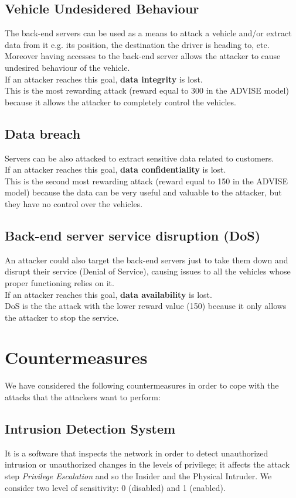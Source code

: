 \subsection*{Vehicle Undesidered Behaviour}
The back-end servers can be used as a means to attack a vehicle and/or extract data from it e.g. its position, the destination the driver is heading to, etc.\\
Moreover having accesses to the back-end server allows the attacker to cause undesired behaviour of the vehicle.\\
If an attacker reaches this goal, \textbf{data integrity} is lost.\\
This is the most rewarding attack (reward equal to 300 in the ADVISE model) because it allows the attacker to completely control the vehicles.

\subsection*{Data breach}
Servers can be also attacked to extract sensitive data related to customers.\\
If an attacker reaches this goal, \textbf{data confidentiality} is lost.\\
This is the second most rewarding attack (reward equal to 150 in the ADVISE model) because the data can be very useful and valuable to the attacker, but they have no control over the vehicles.

\subsection*{Back-end server service disruption (DoS)}
An attacker could also target the back-end servers just to take them down and disrupt their service (Denial of Service), causing issues to all the vehicles whose proper functioning relies on it.\\
If an attacker reaches this goal, \textbf{data availability} is lost.\\
DoS is the the attack with the lower reward value (150) because it only allows the attacker to stop the service.

\section{Countermeasures}
\noindent We have considered the following countermeasures in order to cope with the attacks that the attackers want to perform:

\subsection*{Intrusion Detection System}
\noindent It is a software that inspects the network in order to detect unauthorized intrusion or unauthorized changes in the levels of privilege; it affects the attack step \textit{Privilege Escalation} and so the Insider and the Physical Intruder. We consider two level of sensitivity: 0 (disabled) and 1 (enabled).


